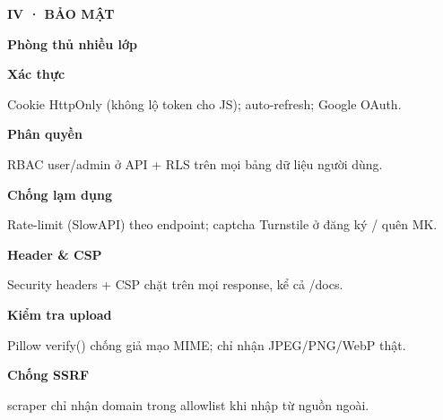 \documentclass[aspectratio=169,10pt]{beamer}
\newcommand{\kick}[1]{{\headfont\bfseries\footnotesize\textcolor{mred}{\MakeUppercase{#1}}}}
\newcommand{\slidehead}[2]{%
  \kick{#1}\par\vspace{0.6mm}%
  {\headfont\bfseries\LARGE\textcolor{ink}{#2}}\par\vspace{1.2mm}}
\begin{document}
\begin{frame}
\slidehead{IV · Bảo mật}{Phòng thủ nhiều lớp}
\vspace{0.5mm}\footnotesize
\begin{tcbraster}[raster columns=3, raster equal height=rows, raster column skip=2.5mm, raster row skip=2mm]
\begin{tcolorbox}[card]{\headfont\bfseries\color{ink}Xác thực}\par\textcolor{slate}{Cookie HttpOnly (không lộ token cho JS); auto-refresh; Google OAuth.}\end{tcolorbox}
\begin{tcolorbox}[creamcard]{\headfont\bfseries\color{ink}Phân quyền}\par\textcolor{slate}{RBAC user/admin ở API + RLS trên mọi bảng dữ liệu người dùng.}\end{tcolorbox}
\begin{tcolorbox}[card]{\headfont\bfseries\color{ink}Chống lạm dụng}\par\textcolor{slate}{Rate-limit (SlowAPI) theo endpoint; captcha Turnstile ở đăng ký / quên MK.}\end{tcolorbox}
\begin{tcolorbox}[creamcard]{\headfont\bfseries\color{ink}Header \& CSP}\par\textcolor{slate}{Security headers + CSP chặt trên mọi response, kể cả /docs.}\end{tcolorbox}
\begin{tcolorbox}[card]{\headfont\bfseries\color{ink}Kiểm tra upload}\par\textcolor{slate}{Pillow verify() chống giả mạo MIME; chỉ nhận JPEG/PNG/WebP thật.}\end{tcolorbox}
\begin{tcolorbox}[creamcard]{\headfont\bfseries\color{ink}Chống SSRF}\par\textcolor{slate}{scraper chỉ nhận domain trong allowlist khi nhập từ nguồn ngoài.}\end{tcolorbox}
\end{tcbraster}
\end{frame}
\end{document}
